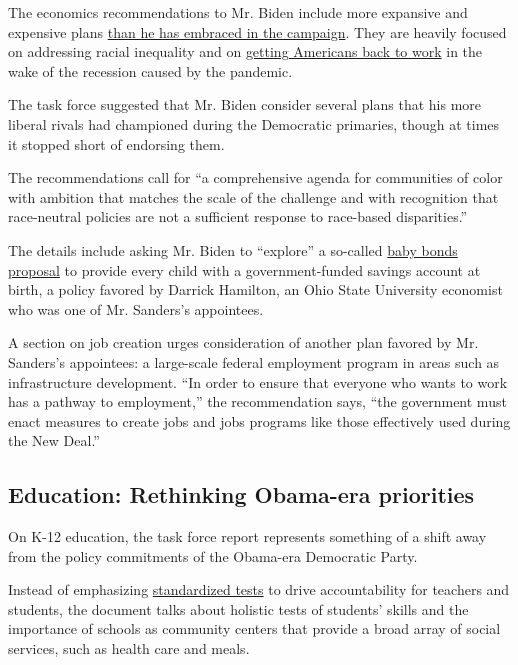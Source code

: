 The economics recommendations to Mr. Biden include more expansive and
expensive plans
\href{https://www.nytimes3xbfgragh.onion/2020/05/17/us/politics/joe-biden-economy-democrats.html}{than
he has embraced in the campaign}. They are heavily focused on addressing
racial inequality and on
\href{https://www.nytimes3xbfgragh.onion/2020/07/21/us/politics/biden-workplace-childcare.html}{getting
Americans back to work} in the wake of the recession caused by the
pandemic.

The task force suggested that Mr. Biden consider several plans that his
more liberal rivals had championed during the Democratic primaries,
though at times it stopped short of endorsing them.

The recommendations call for ``a comprehensive agenda for communities of
color with ambition that matches the scale of the challenge and with
recognition that race-neutral policies are not a sufficient response to
race-based disparities.''

The details include asking Mr. Biden to ``explore'' a so-called
\href{https://www.nytimes3xbfgragh.onion/2019/04/06/us/politics/cory-booker-2020-baby-bonds.html}{baby
bonds proposal} to provide every child with a government-funded savings
account at birth, a policy favored by Darrick Hamilton, an Ohio State
University economist who was one of Mr. Sanders's appointees.

A section on job creation urges consideration of another plan favored by
Mr. Sanders's appointees: a large-scale federal employment program in
areas such as infrastructure development. ``In order to ensure that
everyone who wants to work has a pathway to employment,'' the
recommendation says, ``the government must enact measures to create jobs
and jobs programs like those effectively used during the New Deal.''

\hypertarget{education-rethinking-obama-era-priorities}{%
\subsection{Education: Rethinking Obama-era
priorities}\label{education-rethinking-obama-era-priorities}}

On K-12 education, the task force report represents something of a shift
away from the policy commitments of the Obama-era Democratic Party.

Instead of emphasizing
\href{https://www.nytimes3xbfgragh.onion/2015/10/25/us/obama-administration-calls-for-limits-on-testing-in-schools.html}{standardized
tests} to drive accountability for teachers and students, the document
talks about holistic tests of students' skills and the importance of
schools as community centers that provide a broad array of social
services, such as health care and meals.

